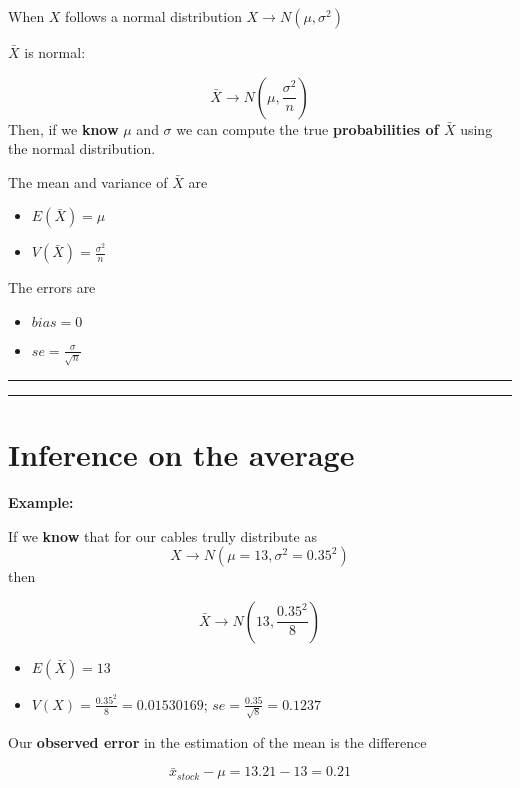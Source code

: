 \documentclass[
]{book}
\providecommand{\tightlist}{%
  \setlength{\itemsep}{0pt}\setlength{\parskip}{0pt}}
\begin{document}
When \(X\) follows a normal distribution \(X \rightarrow N(\mu, \sigma^2)\)

\(\bar{X}\) is normal:

\[\bar{X} \rightarrow N(\mu, \frac{\sigma^2}{n})\]
Then, if we \textbf{know} \(\mu\) and \(\sigma\) we can compute the true \textbf{probabilities of \(\bar{X}\)} using the normal distribution.

The mean and variance of \(\bar{X}\) are

\begin{itemize}
\tightlist
\item
  \(E(\bar{X})=\mu\)
\item
  \(V(\bar{X})=\frac{\sigma^2}{n}\)
\end{itemize}

The errors are

\begin{itemize}
\tightlist
\item
  \(bias=0\)
\item
  \(se= \frac{\sigma}{\sqrt{n}}\)
\end{itemize}

\begin{center}\rule{0.5\linewidth}{0.5pt}\end{center}

\begin{center}\rule{0.5\linewidth}{0.5pt}\end{center}

\hypertarget{inference-on-the-average}{%
\section{Inference on the average}\label{inference-on-the-average}}

\textbf{Example:}

If we \textbf{know} that for our cables trully distribute as \[X \rightarrow N(\mu=13, \sigma^2=0.35^2)\] then

\[\bar{X} \rightarrow N(13, \frac{0.35^2}{8})\]

\begin{itemize}
\tightlist
\item
  \(E(\bar{X})=13\)
\item
  \(V(X)=\frac{0.35^2}{8}=0.01530169\); \(se=\frac{0.35}{\sqrt{8}}=0.1237\)
\end{itemize}

Our \textbf{observed error} in the estimation of the mean is the difference

\[\bar{x}_{stock}-\mu=13.21-13=0.21\]
\end{document}
